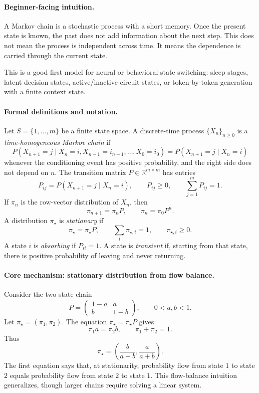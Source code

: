 \paragraph{Beginner-facing intuition.}
A Markov chain is a stochastic process with a short memory. Once the present state is known, the past does not add information about the next step. This does not mean the process is independent across time. It means the dependence is carried through the current state.

This is a good first model for neural or behavioral state switching: sleep stages, latent decision states, active/inactive circuit states, or token-by-token generation with a finite context state.

\paragraph{Formal definitions and notation.}
Let \(S=\{1,\ldots,m\}\) be a finite state space. A discrete-time process \(\{X_n\}_{n\geq0}\) is a \emph{time-homogeneous Markov chain} if
\[
P(X_{n+1}=j\mid X_n=i,X_{n-1}=i_{n-1},\ldots,X_0=i_0)
=P(X_{n+1}=j\mid X_n=i)
\]
whenever the conditioning event has positive probability, and the right side does not depend on \(n\). The transition matrix \(P\in\mathbb R^{m\times m}\) has entries
\[
P_{ij}=P(X_{n+1}=j\mid X_n=i),
\qquad
P_{ij}\geq0,\qquad \sum_{j=1}^m P_{ij}=1.
\]
If \(\pi_n\) is the row-vector distribution of \(X_n\), then
\[
\boxed{\pi_{n+1}=\pi_n P,\qquad \pi_n=\pi_0P^n.}
\]
A distribution \(\pi_\star\) is \emph{stationary} if
\[
\pi_\star=\pi_\star P,\qquad \sum_i \pi_{\star,i}=1,\qquad \pi_{\star,i}\geq0.
\]
A state \(i\) is \emph{absorbing} if \(P_{ii}=1\). A state is \emph{transient} if, starting from that state, there is positive probability of leaving and never returning.

\paragraph{Core mechanism: stationary distribution from flow balance.}
Consider the two-state chain
\[
P=
\begin{pmatrix}
1-a & a\\
b & 1-b
\end{pmatrix},
\qquad 0<a,b<1.
\]
Let \(\pi_\star=(\pi_1,\pi_2)\). The equation \(\pi_\star=\pi_\star P\) gives
\[
\pi_1 a=\pi_2 b,\qquad \pi_1+\pi_2=1.
\]
Thus
\[
\boxed{\pi_\star=\left(\frac{b}{a+b},\frac{a}{a+b}\right).}
\]
The first equation says that, at stationarity, probability flow from state \(1\) to state \(2\) equals probability flow from state \(2\) to state \(1\). This flow-balance intuition generalizes, though larger chains require solving a linear system.

